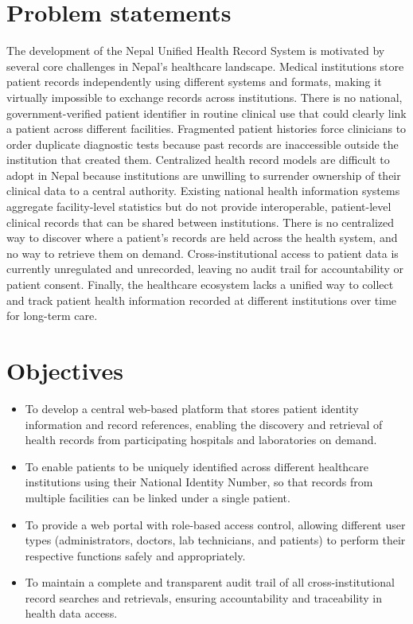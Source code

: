 \documentclass[12pt]{report}
\numberwithin{equation}{chapter}
\begin{document}
\section{Problem statements}
The development of the Nepal Unified Health Record System is motivated by several core challenges in Nepal's healthcare landscape. Medical institutions store patient records independently using different systems and formats, making it virtually impossible to exchange records across institutions. There is no national, government-verified patient identifier in routine clinical use that could clearly link a patient across different facilities. Fragmented patient histories force clinicians to order duplicate diagnostic tests because past records are inaccessible outside the institution that created them. Centralized health record models are difficult to adopt in Nepal because institutions are unwilling to surrender ownership of their clinical data to a central authority. Existing national health information systems aggregate facility-level statistics but do not provide interoperable, patient-level clinical records that can be shared between institutions. There is no centralized way to discover where a patient's records are held across the health system, and no way to retrieve them on demand. Cross-institutional access to patient data is currently unregulated and unrecorded, leaving no audit trail for accountability or patient consent. Finally, the healthcare ecosystem lacks a unified way to collect and track patient health information recorded at different institutions over time for long-term care.

\section{Objectives}
\begin{itemize}
    \item To develop a central web-based platform that stores patient identity information and record references, enabling the discovery and retrieval of health records from participating hospitals and laboratories on demand.
    \item To enable patients to be uniquely identified across different healthcare institutions using their National Identity Number, so that records from multiple facilities can be linked under a single patient.
    \item To provide a web portal with role-based access control, allowing different user types (administrators, doctors, lab technicians, and patients) to perform their respective functions safely and appropriately.
    \item To maintain a complete and transparent audit trail of all cross-institutional record searches and retrievals, ensuring accountability and traceability in health data access.
\end{itemize}
\end{document}
